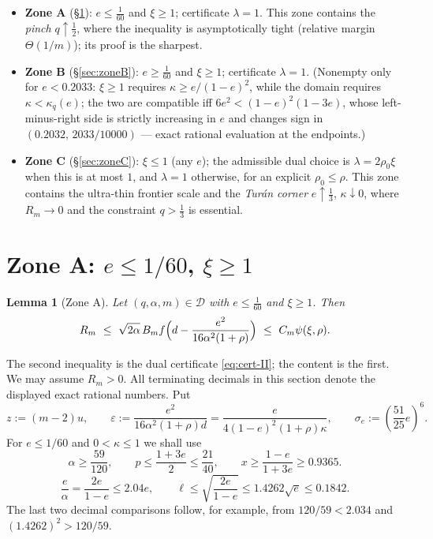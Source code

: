 \documentclass[11pt]{article}
\newtheorem{lemma}[theorem]{Lemma}
\newcommand{\eps}{\varepsilon}
\begin{document}
\begin{itemize}[leftmargin=2em]
\item \textbf{Zone A} (\S\ref{sec:zoneA}): $e\le\tfrac1{60}$ and $\xi\ge1$;
certificate $\lambda=1$.  This zone contains the \emph{pinch}
$q\uparrow\tfrac12$, where the inequality is asymptotically tight (relative
margin $\Theta(1/m)$); its proof is the sharpest.
\item \textbf{Zone B} (\S\ref{sec:zoneB}): $e\ge\tfrac1{60}$ and $\xi\ge1$;
certificate $\lambda=1$.  (Nonempty only for $e<0.2033$: $\xi\ge1$ requires
$\kappa\ge e/(1-e)^2$, while the domain requires $\kappa<\kappa_q(e)$; the two
are compatible iff $6e^2<(1-e)^2(1-3e)$, whose left-minus-right side is
strictly increasing in $e$ and changes sign in $(0.2032,\,2033/10000)$ ---
exact rational evaluation at the endpoints.)
\item \textbf{Zone C} (\S\ref{sec:zoneC}): $\xi\le1$ (any $e$); the
admissible dual choice is $\lambda=2\rho_0\xi$ when this is at most $1$,
and $\lambda=1$ otherwise, for an explicit $\rho_0\le\rho$.  This zone
contains the ultra-thin frontier scale
and the \emph{Tur\'an corner} $e\uparrow\tfrac13$, $\kappa\downarrow0$, where
$R_m\to0$ and the constraint $q>\tfrac13$ is essential.
\end{itemize}

\section{Zone A: \texorpdfstring{$e\le1/60$, $\xi\ge1$}{e <= 1/60, xi >= 1}}\label{sec:zoneA}

\begin{lemma}[Zone A]\label{lem:zoneA}
Let $(q,\alpha,m)\in\mathcal D$ with $e\le\tfrac1{60}$ and $\xi\ge1$.  Then
\begin{equation}\label{eq:zoneA-target}
        R_m\ \le\
        \sqrt{2\alpha}\,B_m f\Bigl(d-\frac{e^2}{16\alpha^2(1+\rho)}\Bigr)
        \ \le\ C_m\psi(\xi,\rho).
\end{equation}
\end{lemma}

The second inequality is the dual certificate \eqref{eq:cert-II}; the content
is the first.  We may assume $R_m>0$.  All terminating decimals in this
section denote the displayed exact rational numbers.  Put
\[
        z:=(m-2)u,
        \qquad
        \eps:=\frac{e^2}{16\alpha^2(1+\rho)d}
        =\frac{e}{4(1-e)^2(1+\rho)\kappa},
        \qquad
        \sigma_e:=\left(\frac{51}{25}e\right)^6.
\]
For $e\le1/60$ and $0<\kappa\le1$ we shall use
\begin{equation}\label{eq:standing}
 \alpha\ge\frac{59}{120},\qquad
 p\le\frac{1+3e}{2}\le\frac{21}{40},\qquad
 x\ge\frac{1-e}{1+3e}\ge0.9365.
\end{equation}
\begin{equation}\label{eq:standing2}
 \frac e\alpha=\frac{2e}{1-e}\le2.04e,
 \qquad
 \ell\le\sqrt{\frac{2e}{1-e}}\le1.4262\sqrt e\le0.1842.
\end{equation}
The last two decimal comparisons follow, for example, from
$120/59<2.034$ and $(1.4262)^2>120/59$.
\end{document}
